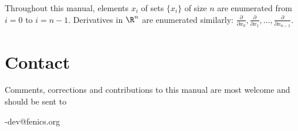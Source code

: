 Throughout this manual, elements $x_i$ of sets $\{x_i\}$ of size $n$
are enumerated from $i = 0$ to $i = n-1$. Derivatives in $\R^n$ are
enumerated similarly:
$\frac{\partial}{\partial x_0}, \frac{\partial}{\partial x_1},
 \ldots, \frac{\partial}{\partial x_{n-1}}$.

\section*{Contact}

Comments, corrections and contributions to this manual are most welcome
and should be sent to
\begin{macrocode}
\packagett{}-dev@fenics.org
\end{macrocode}
